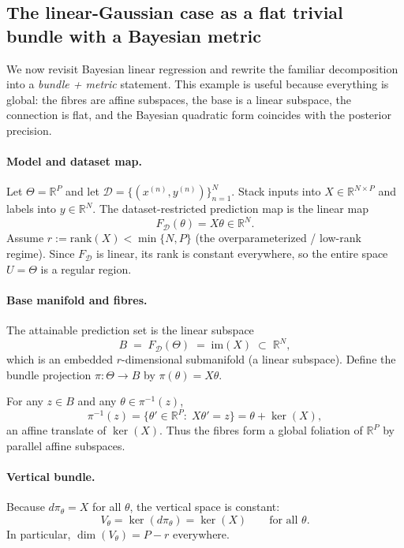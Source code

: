 \subsection{The linear-Gaussian case as a flat trivial bundle with a Bayesian metric}
\label{subsec:linear_gaussian_geometric_language}

We now revisit Bayesian linear regression and rewrite the familiar decomposition
into a \emph{bundle + metric} statement. This example is useful because everything is global:
the fibres are affine subspaces, the base is a linear subspace, the connection is flat,
and the Bayesian quadratic form coincides with the posterior precision.

\paragraph{Model and dataset map.}
Let $\Theta=\mathbb R^P$ and let $\mathcal D=\{(x^{(n)},y^{(n)})\}_{n=1}^N$.
Stack inputs into $X\in\mathbb R^{N\times P}$ and labels into $y\in\mathbb R^N$.
The dataset-restricted prediction map is the linear map
\[
F_{\mathcal D}(\theta)=X\theta \in \mathbb R^N.
\]
Assume $r:=\mathrm{rank}(X)<\min\{N,P\}$ (the overparameterized / low-rank regime).
Since $F_{\mathcal D}$ is linear, its rank is constant everywhere, so the entire space
$U=\Theta$ is a regular region.

\paragraph{Base manifold and fibres.}
The attainable prediction set is the linear subspace
\[
B \;=\; F_{\mathcal D}(\Theta)\;=\;\mathrm{im}(X)\;\subset\;\mathbb R^N,
\]
which is an embedded $r$-dimensional submanifold (a linear subspace).
Define the bundle projection $\pi:\Theta\to B$ by $\pi(\theta)=X\theta$.

For any $z\in B$ and any $\theta\in\pi^{-1}(z)$,
\[
\pi^{-1}(z)=\{\theta'\in\mathbb R^P:\;X\theta'=z\}
=\theta+\ker(X),
\]
an affine translate of $\ker(X)$. Thus the fibres form a global foliation of $\mathbb R^P$
by parallel affine subspaces.

\paragraph{Vertical bundle.}
Because $d\pi_\theta=X$ for all $\theta$, the vertical space is constant:
\[
V_\theta=\ker(d\pi_\theta)=\ker(X)\qquad\text{for all }\theta.
\]
In particular, $\dim(V_\theta)=P-r$ everywhere.

